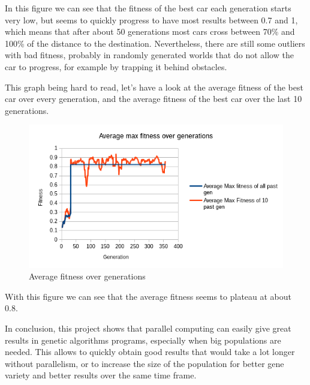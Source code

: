 \documentclass{acm_proc_article-sp}
\begin{document}
In this figure we can see that the fitness of the best car each generation starts very low, but seems to quickly progress to have most results between 0.7 and 1, which means that after about 50 generations most cars cross between 70\% and 100\% of the distance to the destination. Nevertheless, there are still some outliers with bad fitness, probably in randomly generated worlds that do not allow the car to progress, for example by trapping it behind obstacles.

This graph being hard to read, let's have a look at the average fitness of the best car over every generation, and the average fitness of the best car over the last 10 generations.

\begin{figure}[!htbp]
\centering
\includegraphics[width=\linewidth]{./images/average_fitness.png}
\caption{Average fitness over generations}
\label{fig3}
\end{figure}

With this figure we can see that the average fitness seems to plateau at about 0.8.

In conclusion, this project shows that parallel computing can easily give great results in genetic algorithms programs, especially when big populations are needed. This allows to quickly obtain good results that would take a lot longer without parallelism, or to increase the size of the population for better gene variety and better results over the same time frame.



%
%
%
%
\end{document}
